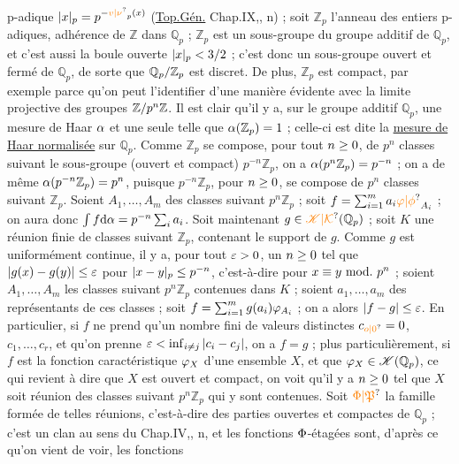 p-adique $\handwritten{|}x\handwritten{|}_{p}=p^{-\unsure{v|\nu}_{p}(x)}$ (\uline{Top.Gén.} Chap.IX,, n) ; soit $\mathbb{Z}_{p}$ l'anneau des entiers p-adiques, adhérence de $\mathbb{Z}$ dans $\mathbb{Q}_{p}$ ; $\mathbb{Z}_{p}$ est un sous-groupe du groupe additif de $\mathbb{Q}_{p}$, et c'est aussi la boule ouverte $|x|_{p}<3/2$ ; c'est donc un sous-groupe ouvert et fermé de $\mathbb{Q}_{p}$, de sorte que $\mathbb{Q}_{p}/\mathbb{Z}_{p}$ est discret. De plus, $\mathbb{Z}_{p}$ est compact, par exemple parce qu'on peut l'identifier d'une manière évidente avec la limite projective des groupes $\mathbb{Z}/p^{n}\mathbb{Z}$. Il est clair qu'il y a, sur le groupe additif $\mathbb{Q}_{p}$, une mesure de Haar $\alpha$ et une seule telle que $\alpha(\mathbb{Z}_{p})=1$ ; celle-ci est dite la \uline{mesure de Haar normalisée} sur $\mathbb{Q}_{p}$. Comme $\mathbb{Z}_{p}$ se compose, pour tout $n\geq0$, de $p^{n}$ classes suivant le sous-groupe (ouvert et compact) $p^{-n}\mathbb{Z}_{p}$, on a $\alpha(p^{n}\mathbb{Z}_{p})=p^{-n}$ ; on a de même $\alpha(p^{-n}\mathbb{Z}_{p})=p^{n}$, puisque $p^{-n}\mathbb{Z}_{p}$, pour $n\geq0$, se compose de $p^{n}$ classes suivant $\mathbb{Z}_{p}$. Soient $A_{1},\ldots,A_{m}$ des classes suivant $p^{n}\mathbb{Z}_{p}$ ; soit $f=\handwritten{\sum}_{i=1}^{m}a_{i}\handwritten{\unsure{\varphi|\phi}}_{A_{i}}$ ; on aura donc $\int f\mathrm{d}\alpha=p^{-n}\sum_{i}a_{i}$. Soit maintenant $g\handwritten{\in}\handwritten{\unsure{\mathscr{K}|\mathcal{K}}}(\mathbb{Q}_{p})$ ; soit $K$ une réunion finie de classes suivant $\mathbb{Z}_{p}$, contenant le support de $g$. Comme $g$ est uniformément continue, il y a, pour tout $\varepsilon>0$, un $n\geq0$ tel que $|g(x)-g(y)|\leq\varepsilon$ pour $|x-y|_{p}\leq p^{-n}$, c'est-à-dire pour $x\handwritten{\equiv}y\ \mathrm{mod.}\ p^{n}$ ; soient $A_{1},\ldots,A_{m}$ les classes suivant $p^{n}\mathbb{Z}_{p}$ contenues dans $K$ ; soient $a_{1},\ldots,a_{m}$ des représentants de ces classes ; soit $f=\sum_{i=1}^{m}g(a_{i})\varphi_{A_{i}}$ ; on a alors $|f-g|\leq\varepsilon$. En particulier, si $f$ ne prend qu'un nombre fini de valeurs distinctes $c_{\unsure{o|0}}=0$, $c_{1},\ldots,c_{r}$, et qu'on prenne $\varepsilon<\inf_{i\ne j}|c_{i}-c_{j}|$, on a $f=g$ ; plus particulièrement, si $f$ est la fonction caractéristique $\varphi_{X}$ d'une ensemble $X$, et que $\varphi_{X}\in\mathscr{K}(\mathbb{Q}_{p})$, ce qui revient à dire que $X$ est ouvert et compact, on voit qu'il y a $n\geq0$ tel que $X$ soit réunion des classes suivant $p^{n}\mathbb{Z}_{p}$ qui y sont contenues. Soit $\handwritten{\unsure{\Phi|\mathfrak{P}}}$ la famille formée de telles réunions, c'est-à-dire des parties ouvertes et compactes de $\mathbb{Q}_{p}$ ; c'est un clan au sens du Chap.IV,, n, et les fonctions $\Phi$-étagées sont, d'après ce qu'on vient de voir, les fonctions
